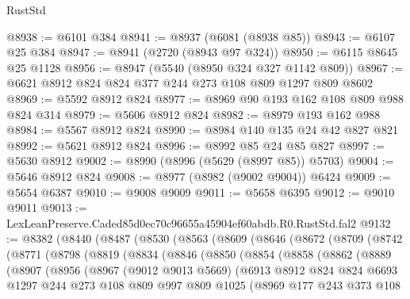 \begin{lexlean}{RustStd}
\begin{coremodule}
@8938 := @6101 @384
@8941 := @8937 (@6081 (@8938 @85))
@8943 := @6107 @25 @384
@8947 := @8941 (@2720 (@8943 @97 @324))
@8950 := @6115 @8645 @25 @1128
@8956 := @8947 (@5540 (@8950 @324 @327 @1142 @809))
@8967 := @6621 @8912 @824 @824 @377 @244 @273 @108 @809 @1297 @809 @8602
@8969 := @5592 @8912 @824
@8977 := @8969 @90 @193 @162 @108 @809 @988 @824 @314
@8979 := @5606 @8912 @824
@8982 := @8979 @193 @162 @988
@8984 := @5567 @8912 @824
@8990 := @8984 @140 @135 @24 @42 @827 @821
@8992 := @5621 @8912 @824
@8996 := @8992 @85 @24 @85 @827
@8997 := @5630 @8912
@9002 := @8990 (@8996 (@5629 (@8997 @85)) @5703)
@9004 := @5646 @8912 @824
@9008 := @8977 (@8982 (@9002 @9004)) @6424
@9009 := @5654 @6387
@9010 := @9008 @9009
@9011 := @5658 @6395
@9012 := @9010 @9011
@9013 := LexLeanPreserve.Caded85d0ec70c96655a45904ef60abdb.R0.RustStd.fal2
@9132 := @8382
    (@8440
      (@8487
        (@8530
          (@8563
            (@8609
              (@8646
                (@8672
                  (@8709
                    (@8742
                      (@8771
                        (@8798
                          (@8819
                            (@8834
                              (@8846
                                (@8850
                                  (@8854
                                    (@8858
                                      (@8862
                                        (@8889
                                          (@8907
                                            (@8956
                                              (@8967
                                                (@9012 @9013 @5669)
                                                (@6913
                                                  @8912
                                                  @824
                                                  @824
                                                  @6693
                                                  @1297
                                                  @244
                                                  @273
                                                  @108
                                                  @809
                                                  @997
                                                  @809
                                                  @1025
                                                  (@8969
                                                    @177
                                                    @243
                                                    @373
                                                    @108

\end{coremodule}
\end{lexlean}
